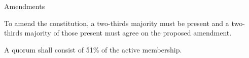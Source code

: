 {
	\begin{article}{Amendments}
		\item To amend the constitution, a two-thirds majority must be present and a two-thirds majority of those present must agree on the proposed amendment.
		\item A quorum shall consist of 51\% of the active membership.
	\end{article}
}